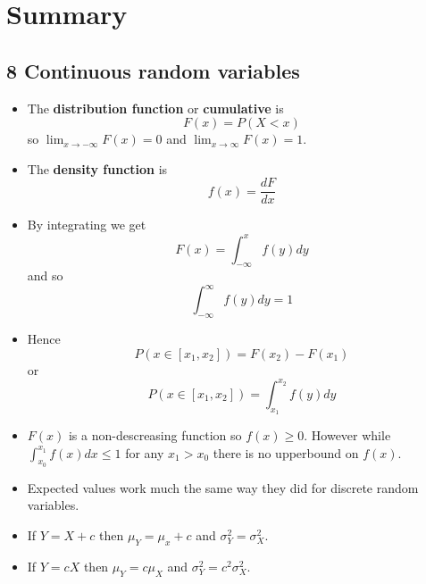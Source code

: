
\ifind
\section*{Summary}
\else
\subsection*{8 Continuous random variables}
\fi

\begin{itemize}

\item The \textbf{distribution function} or \textbf{cumulative} is
  \begin{equation}
F(x)=P(X<x)
  \end{equation}
  so $\lim_{x\rightarrow -\infty}F(x)=0$ and $\lim_{x\rightarrow \infty}F(x)=1$.
  

\item The \textbf{density function} is
  \begin{equation}
f(x)=\frac{dF}{dx}
  \end{equation}

\item By integrating we get
  \begin{equation}
    F(x)=\int_{-\infty}^x f(y)dy
  \end{equation}
  and so
  \begin{equation}
    \int_{-\infty}^\infty f(y)dy=1
  \end{equation}

\item Hence
  \begin{equation}
P(x\in [x_1,x_2])=F(x_2)-F(x_1)
\end{equation}
or
\begin{equation}
P(x\in [x_1,x_2])=\int_{x_1}^{x_2} f(y)dy
\end{equation}

\item $F(x)$ is a non-descreasing function so $f(x)\ge 0$. However while $\int_{x_0}^{x_1} f(x)dx\le 1$ for any $x_1>x_0$ there is no upperbound on $f(x)$.


\item Expected values work much the same way they did for discrete
  random variables.

\item If $Y=X+c$ then $\mu_Y=\mu_x+c$ and $\sigma_Y^2=\sigma_X^2$.

  \item If $Y=cX$ then $\mu_Y=c\mu_X$ and $\sigma_Y^2=c^2\sigma_X^2$.

    \end{itemize}

